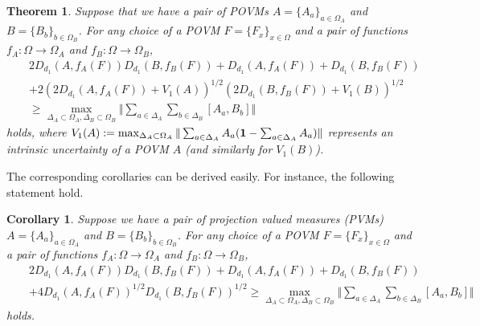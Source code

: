 \documentclass[12pt,showpacs,preprintnumbers,amsmath,amssymb]{revtex4-2}
\newtheorem{theorem}{Theorem}
\newtheorem{corollary}{Corollary}
\begin{document}
\begin{theorem}
Suppose that we have a pair of POVMs $A=\{A_a\}_{a\in \Omega_A}$ 
and $B=\{B_b\}_{b\in \Omega_B}$. For any choice of a POVM 
$F=\{F_x\}_{x\in \Omega}$ and a pair of functions 
$f_A: \Omega \to \Omega_A$ and $f_B: \Omega \to \Omega_B$, 
\begin{eqnarray*}
&&2 D_{d_{1}}(A, f_A(F))D_{d_{1}}(B, f_B(F))
+D_{d_{1}}(A,f_A(F))+D_{d_{1}}(B,f_B(F))
\\
&&
+2 (2D_{d_{1}}(A,f_A(F))+ V_1(A))^{1/2}(2D_{d_{1}}(B,f_B(F))
+V_1(B))^{1/2}
\\
&&
\geq \max_{\Delta_A \subset 
\Omega_A, \Delta_B\subset \Omega_B}\Vert
\sum_{a\in \Delta_A}
\sum_{b \in \Delta_B} [A_a,B_b]\Vert
\end{eqnarray*}
holds, where $V_1(A):=\max_{\Delta_A\subset 
\Omega_A}\Vert \sum_{a\in \Delta_A}
A_a ({\bf 1}-\sum_{a\in \Delta_A} A_a)\Vert$ represents 
an intrinsic uncertainty of a POVM $A$ (and similarly for $V_1(B)$). 
\end{theorem}
The corresponding corollaries can be derived easily.
For instance, the following statement hold.
\begin{corollary}
Suppose we have a pair of projection valued measures (PVMs) 
$A=\{A_a\}_{a\in \Omega_A}$ and $B=\{B_b\}_{b \in \Omega_B}$. 
For any choice of a POVM 
$F=\{F_x\}_{x\in \Omega}$ and a pair of functions 
$f_A: \Omega \to \Omega_A$ and $f_B: \Omega \to \Omega_B$, 
\begin{eqnarray*}
&&2 D_{d_{1}}(A, f_A(F))D_{d_{1}}(B, f_B(F))
+D_{d_{1}}(A,f_A(F))+D_{d_{1}}(B,f_B(F))
\\
&&
+4 D_{d_{1}}(A,f_A(F))^{1/2}D_{d_{1}}(B,f_B(F))^{1/2}
\geq 
\max_{\Delta_A \subset 
\Omega_A, \Delta_B\subset \Omega_B}\Vert
\sum_{a\in \Delta_A}
\sum_{b \in \Delta_B} [A_a,B_b]\Vert
\end{eqnarray*}
holds.
\end{corollary}
%
\end{document}

